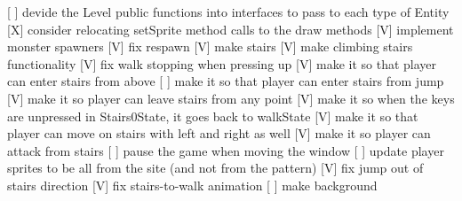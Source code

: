 [ ] devide the Level public functions into interfaces to pass to each type of Entity
[X] consider relocating setSprite method calls to the draw methods
[V] implement monster spawners
[V] fix respawn
[V] make stairs
[V] make climbing stairs functionality
[V] fix walk stopping when pressing up
[V] make it so that player can enter stairs from above
[ ] make it so that player can enter stairs from jump
[V] make it so player can leave stairs from any point
[V] make it so when the keys are unpressed in Stairs0State, it goes back to walkState
[V] make it so that player can move on stairs with left and right as well
[V] make it so player can attack from stairs
[ ] pause the game when moving the window
[ ] update player sprites to be all from the site (and not from the pattern)
[V] fix jump out of stairs direction
[V] fix stairs-to-walk animation
[ ] make background